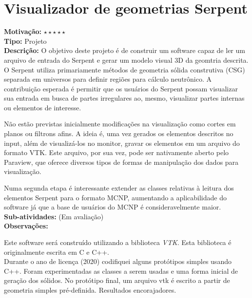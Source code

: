 \chapter{Visualizador de geometrias Serpent}

\textbf{Motivação:} $\star\star\star\star\star$\\

\textbf{Tipo:} Projeto\\

\textbf{Descrição:} O objetivo deste projeto é de construir um software capaz 
de ler um arquivo de entrada do Serpent e gerar um modelo visual 3D da geomtria 
descrita. O Serpent utiliza primariamente métodos de geometria sólida construtiva 
(CSG) separada em universos para definir regiões para cálculo neutrônico. A 
contribuição esperada é permitir que os usuários do Serpent possam visualizar 
sua entrada em busca de partes irregulares ao, mesmo, visualizar partes internas 
ou elementos de interesse.

Não estão previstas inicialmente modificações na visualização como cortes em 
planos ou filtrons afins. A ideia é, uma vez gerados os elementos descritos no 
input, além de visualizá-los no monitor, gravar os elementos em um arquivo 
do formato VTK. Este arquivo, por sua vez, pode ser nativamente aberto pelo 
Paraview, que oferece diversos tipos de formas de manipulação dos dados para 
visualização.

Numa segunda etapa é interessante extender as classes relativas à leitura dos elementos Serpent para o formato MCNP, aumentando a aplicabilidade do software 
já que a base de usuários do MCNP é consideravelmente maior.\\

\textbf{Sub-atividades:} (Em avaliação) \\


\textbf{Observações:}

Este software será construído utilizando a biblioteca \textit{VTK}. Esta biblioteca 
é originalmente escrita em C e C++.\\%
Durante o ano de licença (2020) codifiquei alguns protótipos simples usando C++. Foram experimentadas as classes a serem usadas e uma forma inicial de geração
dos sólidos. No protótipo final, um arquivo vtk é escrito a partir de geometria simples pré-definida. Resultados encorajadores.\\

